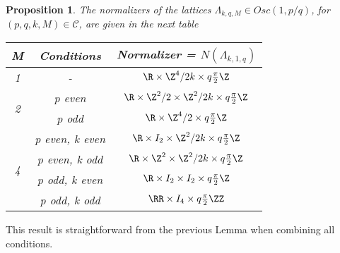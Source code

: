 \documentclass[12pt]{amsart}
\theoremstyle{plain}
\newtheorem{prop}[thm]{Proposition}
\theoremstyle{definition}
\theoremstyle{remark}
\begin{document}
\begin{prop} The normalizers of the lattices $\Lambda_{k,q,M} \in Osc(1,p/q)$, for $(p,q,k,M) \in \mathcal{C}$, are given in the next table



\begin{center}
\def\arraystretch{1.5}
\begin{tabular}{ |c|c|c| } 
\hline
M & Conditions & Normalizer = $N(\Lambda_{k,1,q})$ \\
\hline
\multirow{1}{1em}{1} & - & $\R \times \Z^4 / {2k} \times q \frac{\pi}{2} \Z$ \\ 
\hline
\multirow{2}{1em}{2} & p even & $\R \times \Z^2/2 \times \Z^2 / {2k} \times q \frac{\pi}{2} \Z$ \\ 
&  p odd & $\R \times \Z^4/2 \times q \frac{\pi}{2} \Z$ \\ 
\hline
\multirow{4}{1em}{4} & p even, k even & $\R \times I_2 \times \Z^2 / {2k} \times q \frac{\pi}{2} \Z$ \\ 
&  p even, k odd & $\R \times \Z^2 \times \Z^2 / {2k} \times q \frac{\pi}{2} \Z$ \\ 
&  p odd, k even & $\R \times I_2 \times I_2 \times q \frac{\pi}{2} \Z$\\ 
&  p odd, k odd & $\RR \times I_4  \times q \frac{\pi}{2} \ZZ$ \\ 

\hline
\end{tabular}
\end{center}



\end{prop}

This result is straightforward from the previous Lemma when combining all conditions.



  
  
\end{document}
